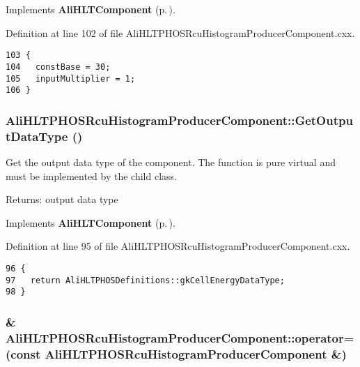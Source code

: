 Implements {\bf Ali\-HLTComponent} {\rm (p.\,\pageref{classAliHLTComponent_a12})}.

Definition at line 102 of file Ali\-HLTPHOSRcu\-Histogram\-Producer\-Component.cxx.

\footnotesize\begin{verbatim}103 {
104   constBase = 30;
105   inputMultiplier = 1;
106 }
\end{verbatim}\normalsize 


\subsubsection{ Ali\-HLTPHOSRcu\-Histogram\-Producer\-Component::Get\-Output\-Data\-Type ()\hspace{0.3cm}{\tt  [virtual]}}\label{classAliHLTPHOSRcuHistogramProducerComponent_a7}


Get the output data type of the component. The function is pure virtual and must be implemented by the child class. \begin{Desc}
\item[Returns:]output data type \end{Desc}


Implements {\bf Ali\-HLTComponent} {\rm (p.\,\pageref{classAliHLTComponent_a11})}.

Definition at line 95 of file Ali\-HLTPHOSRcu\-Histogram\-Producer\-Component.cxx.

\footnotesize\begin{verbatim}96 {
97   return AliHLTPHOSDefinitions::gkCellEnergyDataType;
98 }
\end{verbatim}\normalsize 


\subsubsection{\& Ali\-HLTPHOSRcu\-Histogram\-Producer\-Component::operator= (const {\bf Ali\-HLTPHOSRcu\-Histogram\-Producer\-Component} \&)\hspace{0.3cm}{\tt  [inline, private]}}\label{classAliHLTPHOSRcuHistogramProducerComponent_d1}




